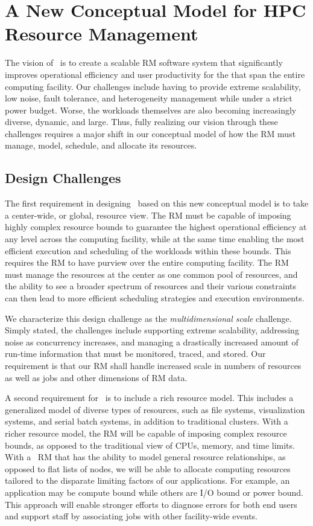 \section{A New Conceptual Model for HPC Resource Management}
The vision of \flux\ is to create a scalable RM
software system that significantly improves
operational efficiency and user productivity
for the that span the entire
computing facility.
Our challenges include having to provide extreme
scalability, low noise, fault tolerance, 
and heterogeneity management while under a strict power budget.
Worse, the workloads themselves are also becoming
increasingly diverse, dynamic, and large.
Thus, fully realizing our vision through
these challenges requires a major shift
in our conceptual model of how the RM must manage, model, schedule, 
and allocate its resources.

\subsection{Design Challenges}
\label{sect:challenges}

The first requirement in designing \flux\ based on this
new conceptual model is to take a center-wide, or global,
resource view.  The RM must be capable of
imposing highly complex resource bounds
to guarantee the highest operational efficiency
at any level across the computing facility, 
while at the same time enabling the most efficient
execution and scheduling of the workloads
within these bounds.
This requires the RM to have purview over 
the entire computing facility. 
The RM must manage the resources at the center
as one common pool of resources, and the ability
to see a broader spectrum of resources
and their various constraints can then lead to
more efficient scheduling strategies
and execution environments. 

We characterize this design challenge as the {\em multidimensional
scale} challenge.  Simply stated, the challenges include
supporting extreme scalability, addressing noise as concurrency
increases, and managing a drastically increased amount of
run-time information that must be monitored, traced, and stored.
Our requirement is that our RM shall handle increased scale in
numbers of resources as well as jobs and other dimensions of RM data.

A second requirement for \flux\ is to include a rich resource model.
This includes a generalized model of diverse types of resources,
such as file systems, visualization systems, and serial batch systems,
in addition to traditional clusters.   With a richer resource model,
the RM will be capable of imposing complex resource bounds,
as opposed to the traditional view of CPUs, memory, and time limits.
With a \flux\ RM that has the ability to model general resource
relationships, as opposed to flat lists of nodes, we will be able
to allocate computing resources tailored to the disparate limiting
factors of our applications.  For example, an application may be
compute bound while others are I/O bound or power bound.
This approach will enable stronger efforts to diagnose errors
for both end users and support staff by associating jobs
with other facility-wide events.


